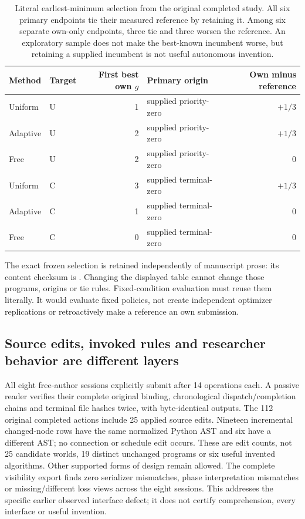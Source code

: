 \begin{table}[t]
\centering\small
\setlength{\tabcolsep}{5pt}
\begin{tabular}{llrlr}
\toprule
Method & Target & First best own $g$ & Primary origin & Own minus reference\\
\midrule
Uniform & U & 1 & supplied priority-zero & $+1/3$\\
Adaptive & U & 2 & supplied priority-zero & $+1/3$\\
Free & U & 2 & supplied priority-zero & $0$\\
Uniform & C & 3 & supplied terminal-zero & $+1/3$\\
Adaptive & C & 1 & supplied terminal-zero & $0$\\
Free & C & 0 & supplied terminal-zero & $0$\\
\bottomrule
\end{tabular}
\caption{Literal earliest-minimum selection from the original completed study.
All six primary endpoints tie their measured reference by retaining it.
Among six separate own-only endpoints, three tie and three worsen the reference.
An exploratory sample does not make the best-known incumbent worse, but
retaining a supplied incumbent is not useful autonomous invention.}
\label{tab:corrected-choice-frozen-endpoints}
\end{table}

The exact frozen selection is retained independently of manuscript prose:
its content checksum is
\allowbreak{}\allowbreak
{}\allowbreak{}.
Changing the displayed table cannot change those programs, origins or tie rules.
Fixed-condition evaluation must reuse them literally. It would evaluate fixed
policies, not create independent optimizer replications or retroactively make
a reference an own submission.

\subsection{Source edits, invoked rules and researcher behavior are different layers}
All eight free-author sessions explicitly submit after 14 operations each.
A passive reader verifies their complete original binding, chronological
dispatch/completion chains and terminal file hashes twice, with byte-identical
outputs. The 112 original completed actions include 25 applied source edits.
Nineteen incremental changed-node rows have the same normalized Python AST
and six have a different AST; no connection or schedule edit occurs. These
are edit counts, not 25 candidate worlds, 19 distinct unchanged programs or
six useful invented algorithms. Other supported forms of design remain allowed.
The complete visibility export finds zero serializer mismatches, phase
interpretation mismatches or missing/different loss views across the eight
sessions. This addresses the specific earlier observed interface defect;
it does not certify comprehension, every interface or useful invention.

